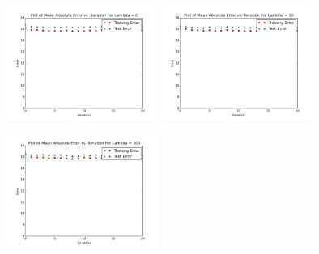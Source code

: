 \documentclass[12pt]{article}
\newcommand{\factwidth}{0.44}
\newcommand{\factheight}{1.6in}
\begin{document}
\begin{figure}[H]
\centering
\includegraphics[width=0\factwidth\textwidth,height=\factheight]{matrix_plots/test-i40d1l0.png}
\includegraphics[width=0\factwidth\textwidth,height=\factheight]{matrix_plots/test-i40d1l10.png}
\includegraphics[width=0\factwidth\textwidth,height=\factheight]{matrix_plots/test-i40d1l100.png}

\end{figure}
\end{document}
